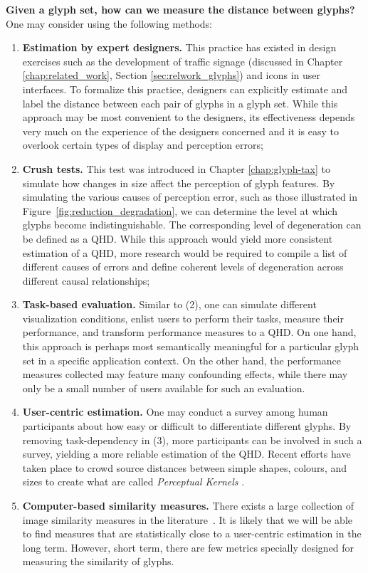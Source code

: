 \noindent\textbf{Given a glyph set, how can we measure the distance between glyphs?} One may consider using the following methods:
\begin{enumerate}
\vspace{-1mm}
\item \textbf{Estimation by expert designers.} This practice has existed in design exercises such as the development of traffic signage (discussed in Chapter \ref{chap:related_work}, Section \ref{sec:relwork_glyphs}) and icons in user interfaces.
To formalize this practice, designers can explicitly estimate and label the distance between each pair of glyphs in a glyph set.
While this approach may be most convenient to the designers, its effectiveness depends very much on the experience of the designers concerned and it is easy to overlook certain types of display and perception errors;
\vspace{-1mm}
\item \textbf{Crush tests.} This test was introduced in Chapter \ref{chap:glyph-tax} to simulate how changes in size affect the perception of glyph features.
By simulating the various causes of perception error, such as those illustrated in Figure~\ref{fig:reduction_degradation}, we can determine the level at which glyphs become indistinguishable.
The corresponding level of degeneration can be defined as a QHD.
While this approach would yield more consistent estimation of a QHD, more research would be required to compile a list of different causes of errors and define coherent levels of degeneration across different causal relationships;
\vspace{-1mm}
\item \textbf{Task-based evaluation.} Similar to (2), one can simulate different visualization conditions, enlist users to perform their tasks, measure their performance, and transform performance measures to a QHD.
On one hand, this approach is perhaps most semantically meaningful for a particular glyph set in a specific application context.
On the other hand, the performance measures collected may feature many confounding effects, while there may only be a small number of users available for such an evaluation.
\vspace{-1mm}
\item \textbf{User-centric estimation.} One may conduct a survey among human participants about how easy or difficult to differentiate different glyphs. By removing task-dependency in (3), more participants can be involved in such a survey, yielding a more reliable estimation of the QHD.
Recent efforts have taken place to crowd source distances between simple shapes, colours, and sizes to create what are called \emph{Perceptual Kernels} \cite{demiralplearning}.
\vspace{-2mm}
\item \textbf{Computer-based similarity measures.} There exists a large collection of image similarity measures in the literature~\cite{Sahasrabudhe99, Eler08}.
It is likely that we will be able to find measures that are statistically close to a user-centric estimation in the long term.
However, short term, there are few metrics specially designed for measuring the similarity of glyphs.
\end{enumerate}

